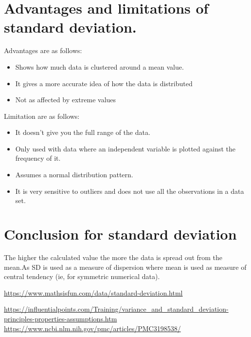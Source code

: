 \documentclass{article}
\begin{document}
\section{Advantages and limitations of standard deviation.}
Advantages are as follows:
\begin{itemize}
  \item Shows how much data is clustered around a mean value.	
  \item It gives a more accurate idea of how the data is distributed
  \item Not as affected by extreme values
\end{itemize}
\break
Limitation are as follows:
\begin{itemize}
  \item It doesn't give you the full range of the data.	
  \item Only used with data where an independent variable is plotted against the frequency of it.
  \item Assumes a normal distribution pattern.
  \item  It is very sensitive to outliers and does not use all the observations in a data set.
\end{itemize}
\section{Conclusion for standard deviation}
The higher the calculated value the more the data is spread out from the mean.As SD is used as a measure of dispersion where mean is used as measure of central tendency (ie, for symmetric numerical data).


  
\begin{thebibliography}{1}

\url{https://www.mathsisfun.com/data/standard-deviation.html}

\url{https://influentialpoints.com/Training/variance_and_standard_deviation-principles-properties-assumptions.htm}
\url{https://www.ncbi.nlm.nih.gov/pmc/articles/PMC3198538/}

\end{thebibliography}
\end{document}

